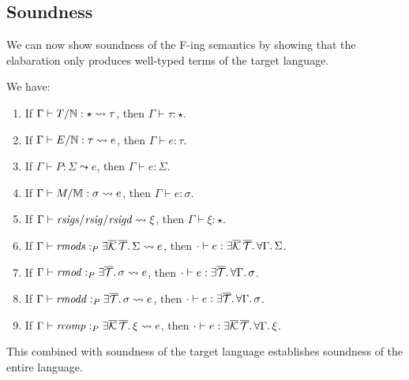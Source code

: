 \documentclass{article}
\begin{document}
\subsection{Soundness}

We can now show soundness of the F-ing semantics by showing that the
elabaration only produces well-typed terms of the target language.

\begin{theorem}
We have:
\begin{enumerate}
    \item If $\Gamma \vdash T/\mathbb{N} : \star \leadsto \tau$, then $\Gamma \vdash \tau : \star$.
    \item If $\Gamma \vdash E/\mathbb{N} : \tau \leadsto e$, then $\Gamma \vdash e : \tau$.
    \item If $\Gamma \vdash P : \Sigma \leadsto e$, then $\Gamma \vdash e : \Sigma$.
    \item If $\Gamma \vdash M/\mathbb{M} : \sigma \leadsto e$, then $\Gamma \vdash e : \sigma$.
    \item If $\Gamma \vdash \mathit{rsigs}/\mathit{rsig}/\mathit{rsigd} \leadsto \xi$, then $\Gamma \vdash \xi : \star$.
    \item If $\Gamma \vdash \mathit{rmods} :_P \exists \overline{\mathcal{K}}\, \overline{\mathcal{T}}.\, \Sigma \leadsto e$, then $\cdot \vdash e : \exists \overline{\mathcal{K}}\, \overline{\mathcal{T}}.\, \forall \Gamma.\, \Sigma$.
    \item If $\Gamma \vdash \mathit{rmod} :_P \exists \overline{\mathcal{T}}.\, \sigma \leadsto e$, then $\cdot \vdash e : \exists \overline{\mathcal{T}}.\, \forall \Gamma.\, \sigma$.
    \item If $\Gamma \vdash \mathit{rmodd} :_P \exists \overline{\mathcal{T}}.\, \sigma \leadsto e$, then $\cdot \vdash e : \exists \overline{\mathcal{T}}.\, \forall \Gamma.\, \sigma$.
    \item If $\Gamma \vdash \mathit{rcomp} :_P \exists \overline{\mathcal{K}}\, \overline{\mathcal{T}}.\, \xi \leadsto e$, then $\cdot \vdash e : \exists \overline{\mathcal{K}}\, \overline{\mathcal{T}}.\, \forall \Gamma.\, \xi$.
\end{enumerate}
\end{theorem}

This combined with soundness of the target language establishes soundness of the
entire language.
\end{document}
